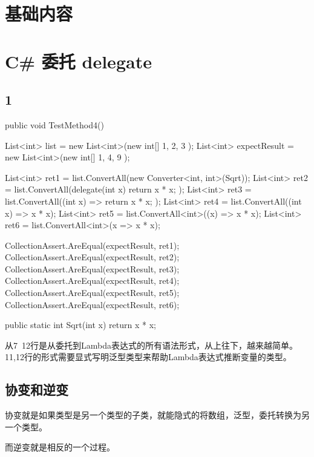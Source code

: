 \chapter{基础内容}

\chapter{C\# 委托 delegate}


\section{1}

\begin{CSharp}[委托，匿名函数和Lambda]
        [TestMethod]
        public void TestMethod4()
        {
            List<int> list = new List<int>(new int[] { 1, 2, 3 });
            List<int> expectResult = new List<int>(new int[] { 1, 4, 9 });

            List<int> ret1 = list.ConvertAll(new Converter<int, int>(Sqrt));
            List<int> ret2 = list.ConvertAll(delegate(int x) { return x * x; });
            List<int> ret3 = list.ConvertAll((int x) => { return x * x; });
            List<int> ret4 = list.ConvertAll((int x) => x * x);
            List<int> ret5 = list.ConvertAll<int>((x) => x * x);
            List<int> ret6 = list.ConvertAll<int>(x => x * x);

            CollectionAssert.AreEqual(expectResult, ret1);
            CollectionAssert.AreEqual(expectResult, ret2);
            CollectionAssert.AreEqual(expectResult, ret3);
            CollectionAssert.AreEqual(expectResult, ret4);
            CollectionAssert.AreEqual(expectResult, ret5);
            CollectionAssert.AreEqual(expectResult, ret6);
        }

        public static int Sqrt(int x)
        {
            return x * x;
        }
\end{CSharp}

从7~12行是从委托到Lambda表达式的所有语法形式，从上往下，越来越简单。11,12行的形式需要显式写明泛型类型来帮助Lambda表达式推断变量的类型。

\section{协变和逆变}

协变就是如果类型是另一个类型的子类，就能隐式的将数组，泛型，委托转换为另一个类型。

而逆变就是相反的一个过程。

